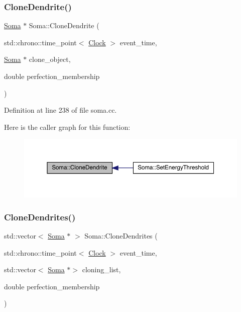 \subsubsection{\texorpdfstring{Clone\+Dendrite()}{CloneDendrite()}}
{\footnotesize\ttfamily \hyperlink{class_soma}{Soma} $\ast$ Soma\+::\+Clone\+Dendrite (\begin{DoxyParamCaption}\item[{std\+::chrono\+::time\+\_\+point$<$ \hyperlink{universe_8h_a0ef8d951d1ca5ab3cfaf7ab4c7a6fd80}{Clock} $>$}]{event\+\_\+time,  }\item[{\hyperlink{class_soma}{Soma} $\ast$}]{clone\+\_\+object,  }\item[{double}]{perfection\+\_\+membership }\end{DoxyParamCaption})}



Definition at line 238 of file soma.\+cc.

Here is the caller graph for this function\+:
\nopagebreak
\begin{figure}[H]
\begin{center}
\leavevmode
\includegraphics[width=350pt]{class_soma_ad51c97b76dd7a1f77dc987ae33fd89bc_icgraph}
\end{center}
\end{figure}
\mbox{\label{class_soma_a3975212d2e3d8675ca14fbc9879e5e54}} 
\subsubsection{\texorpdfstring{Clone\+Dendrites()}{CloneDendrites()}}
{\footnotesize\ttfamily std\+::vector$<$ \hyperlink{class_soma}{Soma} $\ast$ $>$ Soma\+::\+Clone\+Dendrites (\begin{DoxyParamCaption}\item[{std\+::chrono\+::time\+\_\+point$<$ \hyperlink{universe_8h_a0ef8d951d1ca5ab3cfaf7ab4c7a6fd80}{Clock} $>$}]{event\+\_\+time,  }\item[{std\+::vector$<$ \hyperlink{class_soma}{Soma} $\ast$$>$}]{cloning\+\_\+list,  }\item[{double}]{perfection\+\_\+membership }\end{DoxyParamCaption})}



